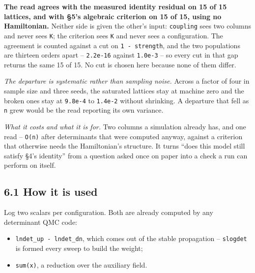 \documentclass[10pt,letterpaper,twocolumn]{article}
\providecommand{\tightlist}{\setlength{\itemsep}{0pt}\setlength{\parskip}{0pt}}
\begin{document}
\textbf{The read agrees with the measured identity residual on 15 of 15 lattices, and with §5's algebraic
criterion on 15 of 15, using no Hamiltonian.} Neither side is given the other's input: \texttt{coupling}
sees two columns and never sees \texttt{K}; the criterion sees \texttt{K} and never sees a configuration. The
agreement is counted against a cut on \texttt{1\ -{}\allowbreak{}\ \textbar{}\allowbreak{}strength\textbar{}\allowbreak{}}, and the two populations are thirteen orders
apart -- \texttt{2.\allowbreak{}2e-{}\allowbreak{}16} against \texttt{1.\allowbreak{}0e-{}\allowbreak{}3} -- so every cut in that gap returns the same 15 of 15. No cut is
chosen here because none of them differ.

\emph{The departure is systematic rather than sampling noise.} Across a factor of four in sample size
and three seeds, the saturated lattices stay at machine zero and the broken ones stay at \texttt{9.\allowbreak{}8e-{}\allowbreak{}4}
to \texttt{1.\allowbreak{}4e-{}\allowbreak{}2} without shrinking. A departure that fell as \texttt{n} grew would be the read reporting its
own variance.

\emph{What it costs and what it is for.} Two columns a simulation already has, and one read -- \texttt{O(\allowbreak{}n)\allowbreak{}}
after determinants that were computed anyway, against a criterion that otherwise needs the
Hamiltonian's structure. It turns ``does this model still satisfy §4's identity'' from a question
asked once on paper into a check a run can perform on itself.

\subsection{6.1 How it is used}\label{61-how-it-is-used}

Log two scalars per configuration. Both are already computed by any determinant QMC code:

\begin{itemize}
\tightlist
\item
  \texttt{ln\textbar{}\allowbreak{}det\_\allowbreak{}up\textbar{}\allowbreak{}\ -{}\allowbreak{}\ ln\textbar{}\allowbreak{}det\_\allowbreak{}dn\textbar{}\allowbreak{}}, which comes out of the stable propagation -- \texttt{slogdet} is formed
  every sweep to build the weight;
\item
  \texttt{sum(\allowbreak{}x)\allowbreak{}}, a reduction over the auxiliary field.
\end{itemize}
\end{document}

